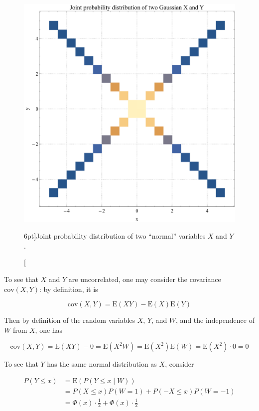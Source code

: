 \begin{figure}
	\includegraphics{exercise/joint_pdf_of_two_Gaussian.pdf}
	\caption[Joint probability distribution of two “normal” variables $X$ and $Y$.][6pt]{Joint probability distribution of two “normal” variables $X$ and $Y$.}
	\label{fig:joint_pdf_sum_of_Gaussian}
\end{figure}

To see that $X$ and $Y$ are uncorrelated, one may consider the covariance $\mathrm{cov} (X,Y)$: by definition, it is

$$
\mathrm{cov}(X, Y) = \mathrm{E}(XY) - \mathrm{E}(X) \mathrm{E}(Y)
$$

Then by definition of the random variables $X$, $Y$, and $W$, and the independence of $W$ from $X$, one has

$$
\mathrm{cov}(X, Y)= \mathrm{E}(XY) - 0 = \mathrm{E}(X^{2} W) = \mathrm{E}(X^{2}) \mathrm{E}(W) = \mathrm{E}(X^{2}) \cdot 0 = 0
$$

To see that $Y$ has the same normal distribution as $X$, consider

$$
\begin{array}{rl}
	P(Y \leq x) &= \mathrm{E}(P(Y \leq x \mid W))\\
	&= P(X \leq x) P(W = 1) + P(- X \leq x) P(W = -1)\\
	&= \Phi(x) \cdot \frac{1}{2} + \Phi(x) \cdot \frac{1}{2}
\end{array}
$$

